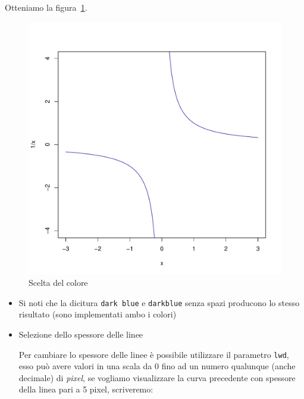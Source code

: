 \documentclass[onecolumn,11pt]{book}\usepackage[]{graphicx}\usepackage[]{color}
\makeatletter
\def\maxwidth{ %
  \ifdim\Gin@nat@width>\linewidth
    \linewidth
  \else
    \Gin@nat@width
  \fi
}
\newenvironment{knitrout}{}{} %
\makeatother
\begin{document}
\begin{itemize}
\begin{itemize}
\begin{knitrout}
\end{knitrout}
Otteniamo la  figura~\ref{colori}.
\begin{figure}[phtb]
\begin{center}
\begin{knitrout}
\color{fgcolor}
\includegraphics[width=\maxwidth]{figure/unnamed-chunk-77-1} 

\end{knitrout}
\caption{Scelta del colore}
\label{colori}
\end{center}
\end{figure}
\end{itemize}
\begin{itemize}
\item Si noti che la dicitura \texttt{dark blue} e \texttt{darkblue} senza spazi producono lo stesso risultato (sono implementati ambo i colori) %
\item{}Selezione dello spessore delle linee

Per cambiare lo spessore delle linee \`e possibile utilizzare il parametro \texttt{lwd}, esso pu\`o avere valori in una scala da 0 fino ad un numero qualunque (anche decimale) di {\it pixel}, se vogliamo  visualizzare la curva precedente con spessore della linea pari a 5 pixel, scriveremo:


\end{itemize}
\end{itemize}
\end{document}
